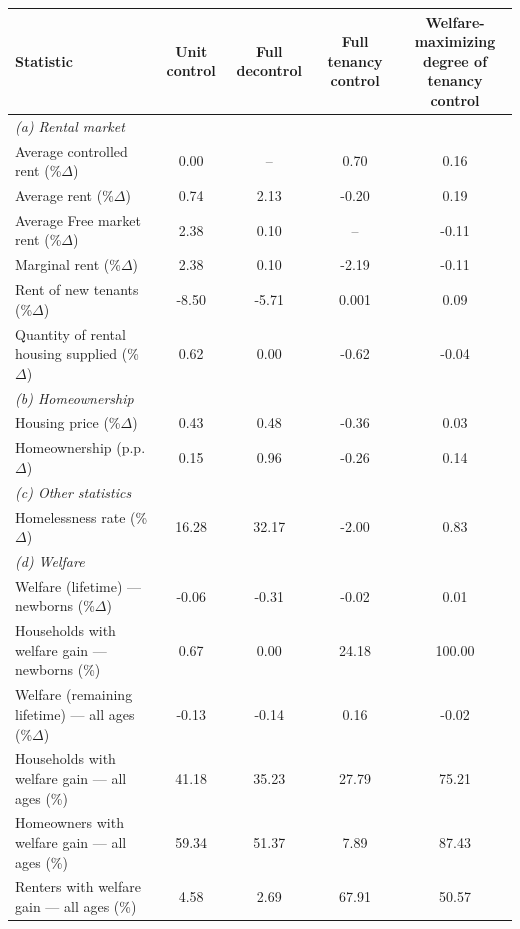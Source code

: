 \begin{table}[p]
\footnotesize
\renewcommand{\arraystretch}{1.2}
\renewcommand{\cellalign}{bc}
\begin{center}
\begin{tabular}{lcccc}
\toprule
Statistic & Unit control & Full decontrol & Full tenancy control & \makecell[l]{Welfare-maximizing\\degree of tenancy control} \\
\midrule
\multicolumn{3}{l}{\textit{(a) Rental market}}\\
Average controlled rent (\%$\Delta$) & 0.00 & -- & 0.70 & 0.16 \\
Average rent (\%$\Delta$) & 0.74 & 2.13 & -0.20 & 0.19\\
Average Free market rent (\%$\Delta$) & 2.38 & 0.10 & -- & -0.11 \\
Marginal rent (\%$\Delta$) & 2.38 & 0.10 & -2.19 & -0.11 \\
Rent of new tenants (\%$\Delta$) & -8.50 & -5.71 & 0.001 & 0.09 \\
Quantity of rental housing supplied (\%$\Delta$) & 0.62 & 0.00 & -0.62 & -0.04 \\
\multicolumn{3}{l}{\textit{(b) Homeownership}}\\
Housing price (\%$\Delta$) & 0.43 & 0.48 & -0.36 & 0.03 \\
Homeownership (p.p. $\Delta$) & 0.15 & 0.96 & -0.26 & 0.14 \\
\multicolumn{3}{l}{\textit{(c) Other statistics}}\\
Homelessness rate (\%$\Delta$) & 16.28 & 32.17 & -2.00 & 0.83 \\
\multicolumn{3}{l}{\textit{(d) Welfare}}\\
Welfare (lifetime) — newborns (\%$\Delta$) & -0.06 & -0.31 & -0.02 & 0.01 \\
Households with welfare gain — newborns (\%) & 0.67 & 0.00 & 24.18 & 100.00 \\
Welfare (remaining lifetime) — all ages (\%$\Delta$) & -0.13 & -0.14 & 0.16 & -0.02 \\
Households with welfare gain — all ages (\%) & 41.18 & 35.23 & 27.79 & 75.21\\
\quad Homeowners with welfare gain — all ages (\%) & 59.34 & 51.37 & 7.89 & 87.43 \\
\quad Renters with welfare gain — all ages (\%) & 4.58 & 2.69 & 67.91 & 50.57\\
\bottomrule
\end{tabular}
\end{center}
\normalsize
\end{table}